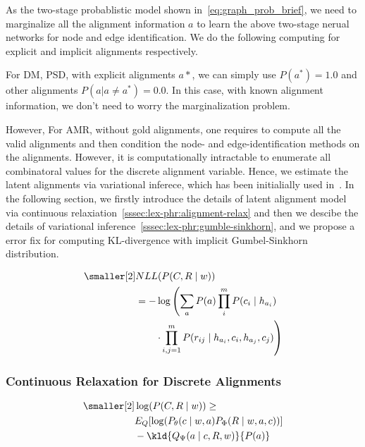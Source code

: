 As the two-stage probablistic model shown
in~\autoref{eq:graph_prob_brief}, we need to marginalize all the
alignment information $a$ to learn the above two-stage nerual networks
for node and edge identification. We do the following computing for
explicit and implicit alignments respectively.

 For DM, PSD, with explicit alignments
$a*$, we can simply use $P(a^{*}) = 1.0$ and other alignments
$P(a | a \neq a^{*}) = 0.0 $. In this case, with known alignment
information, we don't need to worry the marginalization problem.

 However, For AMR, without gold
alignments, one requires to compute all the valid alignments and then
condition the node- and edge-identification methods on the alignments.
However, it is computationally intractable to enumerate all
combinatoral values for the discrete alignment variable. Hence, we
estimate the latent alignments via variational inferece, which has
been initialially used in~\citet{lyu2018amr}. In the following
section, we firstly introduce the details of latent alignment model
via continuous relaxiation~\autoref{sssec:lex-phr:alignment-relax} and
then we descibe the details of variational
inference~\autoref{sssec:lex-phr:gumble-sinkhorn}, and we propose a
error fix for computing KL-divergence with implicit Gumbel-Sinkhorn
distribution.

\begin{equation}
  \label{eq:graph_prob_brief}
\begin{aligned} \smaller[2]
 & NLL(P(C,R \mid w)) \\
 & = - \log\left(\sum_{a}P(a) \prod_{i}^{m} P(c_{i} \mid h_{a_{i}}) \right. \\
 & \qquad \left.\cdot \prod_{i,j=1}^{m}P(r_{ij} \mid h_{a_{i}}, c_{i}, h_{a_{j}}, c_{j})\right)
\end{aligned}
\end{equation}

\subsubsection{Continuous Relaxation for Discrete Alignments}
\label{sssec:lex-phr:alignment-relax}

\begin{equation}
 \label{eq:elbo}
\begin{aligned} \smaller[2]
  & \log(P(C,R \mid w)) \geq \\
  & E_{Q}[\log(P_{\theta}(c\mid w,a) P_{\Phi}(R\mid w,a,c))] \\
  & - \kld{Q_{\Psi}(a\mid c, R,w)}{P(a)}
\end{aligned}
\end{equation}


